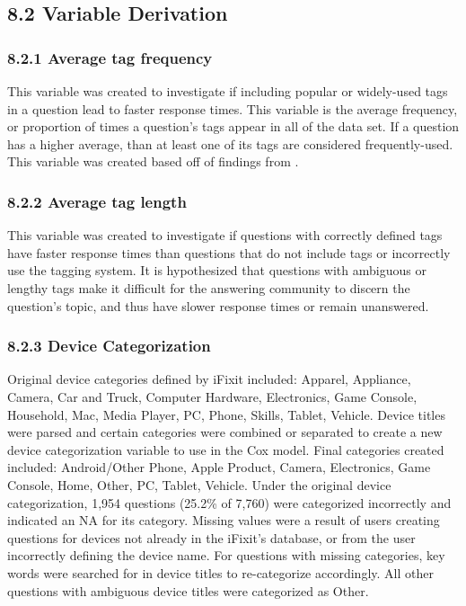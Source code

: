 \documentclass{article}
\begin{document}

\subsection*{8.2 Variable Derivation}

\subsubsection*{8.2.1 Average tag frequency}

This variable was created to investigate if including popular or widely-used tags in a question lead to faster response times. This variable is the average frequency, or proportion of times a question's tags appear in all of the data set. If a question has a higher average, than at least one of its tags are considered frequently-used. This variable was created based off of findings from \cite{Bhat2014}. 


\subsubsection*{8.2.2 Average tag length}

This variable was created to investigate if questions with correctly defined tags have faster response times than questions that do not include tags or incorrectly use the tagging system. It is hypothesized that questions with ambiguous or lengthy tags make it difficult for the answering community to discern the question's topic, and thus have slower response times or remain unanswered. 


\subsubsection*{8.2.3 Device Categorization}

Original device categories defined by iFixit included: Apparel, Appliance, Camera, Car and Truck, Computer Hardware, Electronics, Game Console, Household, Mac, Media Player, PC, Phone, Skills, Tablet, Vehicle. Device titles were parsed and certain categories were combined or separated to create a new device categorization variable to use in the Cox model. Final categories created included: Android/Other Phone, Apple Product, Camera, Electronics, Game Console, Home, Other, PC, Tablet, Vehicle. Under the original device categorization, 1,954 questions (25.2\% of 7,760) were categorized incorrectly and indicated an NA for its category. Missing values were a result of users creating questions for devices not already in the iFixit's database, or from the user incorrectly defining the device name. For questions with missing categories, key words were searched for in device titles to re-categorize accordingly. All other questions with ambiguous device titles were categorized as Other. 
\end{document}
